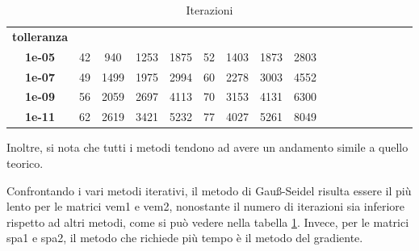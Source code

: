 \begin{table}[!ht]
\begin{subtable}[!ht]{1\textwidth}
{\begin{tabular}{|c|c|c|c|c|c|c|c|c|c|c|c|c|c|c|c|c|}
                \textbf{tolleranza} & ~                 & ~                 & ~             & ~             & ~                 & ~                 & ~             & ~             \\
                \textbf{1e-05}      & 42                & 940               & 1253          & 1875          & 52                & 1403              & 1873          & 2803          \\
                \textbf{1e-07}      & 49                & 1499              & 1975          & 2994          & 60                & 2278              & 3003          & 4552          \\
                \textbf{1e-09}      & 56                & 2059              & 2697          & 4113          & 70                & 3153              & 4131          & 6300          \\
                \textbf{1e-11}      & 62                & 2619              & 3421          & 5232          & 77                & 4027              & 5261          & 8049          \\
            \end{tabular}}
        \caption{Vem 1 e Vem 2}
        \label{tab:vem}
    \end{subtable}
    \caption{Iterazioni}
    \label{tab:iterazioni}
\end{table}
Inoltre, si nota che tutti i metodi tendono ad avere un andamento simile a quello
teorico.

Confrontando i vari metodi iterativi, il metodo di Gauß-Seidel risulta essere il
più lento per le matrici vem1 e vem2, nonostante il numero di iterazioni sia
inferiore rispetto ad altri metodi, come si può vedere nella tabella \ref{tab:iterazioni}.
Invece, per le matrici spa1 e spa2, il metodo che richiede più tempo è il metodo
del gradiente.

